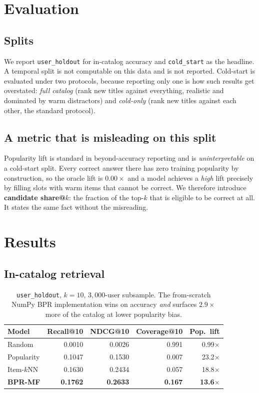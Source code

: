 \documentclass[11pt,a4paper]{article}
\begin{document}
\section{Evaluation}

\subsection{Splits}

We report \texttt{user\_holdout} for in-catalog accuracy and \texttt{cold\_start}
as the headline. A temporal split is not computable on this data and is not
reported. Cold-start is evaluated under two protocols, because reporting only
one is how such results get overstated: \emph{full catalog} (rank new titles
against everything, realistic and dominated by warm distractors) and
\emph{cold-only} (rank new titles against each other, the standard protocol).

\subsection{A metric that is misleading on this split}

Popularity lift is standard in beyond-accuracy reporting and is
\emph{uninterpretable} on a cold-start split. Every correct answer there has
zero training popularity by construction, so the oracle lift is $0.00\times$ and
a model achieves a \emph{high} lift precisely by filling slots with warm items
that cannot be correct. We therefore introduce \textbf{candidate share@$k$}: the
fraction of the top-$k$ that is eligible to be correct at all. It states the
same fact without the misreading.

\section{Results}

\subsection{In-catalog retrieval}

\begin{table}[h]
\centering
\caption{\texttt{user\_holdout}, $k{=}10$, $3{,}000$-user subsample. The
from-scratch NumPy BPR implementation wins on accuracy \emph{and} surfaces
$2.9\times$ more of the catalog at lower popularity bias.}
\begin{tabular}{lrrrr}
\toprule
Model & Recall@10 & NDCG@10 & Coverage@10 & Pop.\ lift \\
\midrule
Random          & 0.0010 & 0.0026 & 0.991 & 0.99$\times$ \\
Popularity      & 0.1047 & 0.1530 & 0.007 & 23.2$\times$ \\
Item-$k$NN      & 0.1630 & 0.2434 & 0.057 & 18.8$\times$ \\
\textbf{BPR-MF} & \textbf{0.1762} & \textbf{0.2633} & \textbf{0.167} & \textbf{13.6}$\times$ \\
\bottomrule
\end{tabular}
\end{table}
\end{document}
